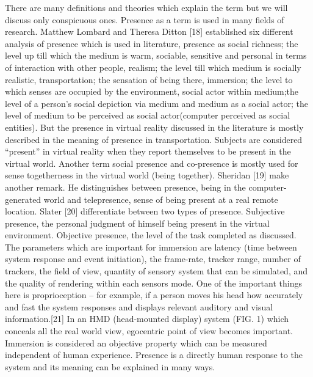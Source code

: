 There are many definitions and theories which explain the term but we will discuss only conspicuous ones. Presence as a term is used in many fields of research. Matthew Lombard and Theresa Ditton [18] established six different analysis of presence which is used in literature, presence as social richness; the level up till which the medium is warm, sociable, sensitive and personal in terms of interaction with other people, realism; the level till which medium is socially realistic, transportation; the sensation of being there, immersion; the level to which senses are occupied by the environment, social actor within medium;the level of a person’s social depiction via medium and medium as a social actor; the level of medium to be perceived as social actor(computer perceived as social entities). But the presence in virtual reality discussed in the literature is mostly described in the meaning of presence in transportation. Subjects are considered “present” in virtual reality when they report themselves to be present in the virtual world. Another term social presence and co-presence is mostly used for sense togetherness in the virtual world (being together). Sheridan [19] make another remark. He distinguishes between presence, being in the computer-generated world and telepresence, sense of being present at a real remote location. Slater [20] differentiate between two types of presence. Subjective presence, the personal judgment of himself being present in the virtual environment. Objective presence, the level of the task completed as discussed.
The parameters which are important for immersion are latency (time between system response and event initiation), the frame-rate, tracker range, number of trackers, the field of view, quantity of sensory system that can be simulated, and the quality of rendering within each sensors mode. One of the important things here is proprioception – for example, if a person moves his head how accurately and fast the system responses and displays relevant auditory and visual information.[21] In an HMD (head-mounted display) system (FIG. 1) which conceals all the real world view, egocentric point of view becomes important. Immersion is considered an objective property which can be measured independent of human experience. Presence is a directly human response to the system and its meaning can be explained in many ways.


